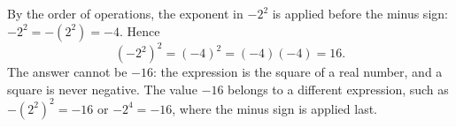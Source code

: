 By the order of operations, the exponent in $-2^2$ is applied before the minus sign: $-2^2=-(2^2)=-4$. Hence
\[\left(-2^2\right)^2=(-4)^2=(-4)(-4)=\boxed{16}.\]
The answer cannot be $-16$: the expression is the square of a real number, and a square is never negative. The value $-16$ belongs to a different expression, such as $-\left(2^2\right)^2=-16$ or $-2^4=-16$, where the minus sign is applied last.
